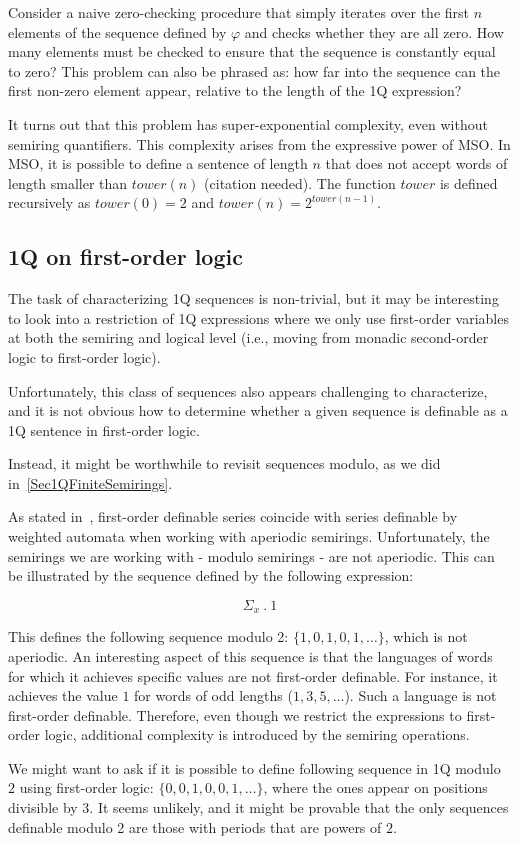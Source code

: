 \documentclass[12pt]{article}
\theoremstyle{definition}
\begin{document}
Consider a naive zero-checking procedure that simply iterates over the first $n$ elements of the sequence defined by $\varphi$ and checks whether they are all zero. How many elements must be checked to ensure that the sequence is constantly equal to zero? This problem can also be phrased as: how far into the sequence can the first non-zero element appear, relative to the length of the 1Q expression?

It turns out that this problem has super-exponential complexity, even without semiring quantifiers. This complexity arises from the expressive power of MSO. In MSO, it is possible to define a sentence of length $n$ that does not accept words of length smaller than $tower(n)$ (citation needed). The function $tower$ is defined recursively as $tower(0) = 2$ and $tower(n) = 2^{tower(n-1)}$.

\subsection*{1Q on first-order logic}
The task of characterizing 1Q sequences is non-trivial, but it may be interesting to look into a restriction of 1Q expressions where we only use first-order variables at both the semiring and logical level (i.e., moving from monadic second-order logic to first-order logic).

Unfortunately, this class of sequences also appears challenging to characterize, and it is not obvious how to determine whether a given sequence is definable as a 1Q sentence in first-order logic.

Instead, it might be worthwhile to revisit sequences modulo, as we did in~\cref{Sec1QFiniteSemirings}.

As stated in~\cite{DrosteG07}, first-order definable series coincide with series definable by weighted automata when working with aperiodic semirings. Unfortunately, the semirings we are working with - modulo semirings - are not aperiodic. This can be illustrated by the sequence defined by the following expression:

$$ \Sigma_x \ . \ 1 $$

This defines the following sequence modulo 2: $\{1, 0, 1, 0, 1, \ldots\}$, which is not aperiodic. An interesting aspect of this sequence is that the languages of words for which it achieves specific values are not first-order definable. For instance, it achieves the value $1$ for words of odd lengths ($1, 3, 5, \ldots$). Such a language is not first-order definable. Therefore, even though we restrict the expressions to first-order logic, additional complexity is introduced by the semiring operations.

We might want to ask if it is possible to define following sequence in 1Q modulo $2$ using first-order logic: $\{0, 0, 1, 0, 0, 1, \ldots\}$, where the ones appear on positions divisible by 3. It seems unlikely, and it might be provable that the only sequences definable modulo 2 are those with periods that are powers of $2$.



\end{document}

